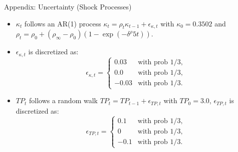 \documentclass[10pt,aspectratio=169]{beamer}
\begin{document}
\begin{frame}[fragile]{Appendix: Uncertainty (Shock Processes)}
\small
\begin{itemize}
    \item $\kappa_t$ follows an AR(1) process $\kappa_t = \rho_t \kappa_{t-1} + \epsilon_{\kappa,t}$ with $\kappa_0 = 0.3502$ and $\rho_t =  \rho_0 + (\rho_\infty - \rho_0) (1-\exp(- \delta^\rho  5t))$.
   \item $\epsilon_{\kappa,t}$ is discretized as:
    \begin{equation}
        \epsilon_{\kappa, t} =
\begin{cases}
0.03 & \text{with prob } 1/3, \\
0.0 & \text{with prob } 1/3, \\
- 0.03 & \text{with prob } 1/3.
\end{cases}
    \end{equation}
    \item $TP_t$ follows a random walk $TP_t = TP_{t-1} + \epsilon_{TP,t}$ with $TP_0 = 3.0$, $\epsilon_{TP,t}$ is discretized as:
    \begin{equation}
        \epsilon_{TP, t} =
\begin{cases}
0.1 & \text{with prob } 1/3, \\
0 & \text{with prob } 1/3, \\
- 0.1 & \text{with prob } 1/3.
\end{cases}
    \end{equation}
\end{itemize}
\end{frame}
\end{document}
